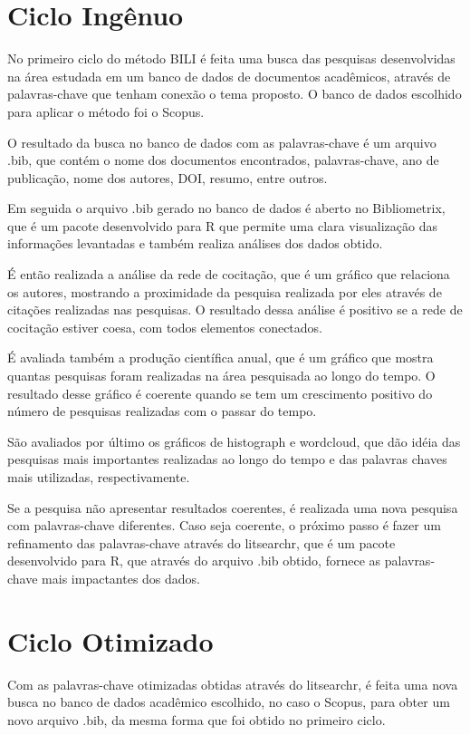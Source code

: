 \section{Ciclo Ingênuo}
No primeiro ciclo do método BILI é feita uma busca das pesquisas desenvolvidas na área estudada em um banco de dados de documentos acadêmicos, através de palavras-chave que tenham conexão o tema proposto. O banco de dados escolhido para aplicar o método foi o Scopus.

O resultado da busca no banco de dados com as palavras-chave é um arquivo .bib, que contém o nome dos documentos encontrados, palavras-chave, ano de publicação, nome dos autores, DOI, resumo, entre outros.

Em seguida o arquivo .bib gerado no banco de dados é aberto no Bibliometrix, que é um pacote desenvolvido para R que permite uma clara visualização das informações levantadas e também realiza análises dos dados obtido. 

É então realizada a análise da rede de cocitação, que é um gráfico que relaciona os autores, mostrando a proximidade da pesquisa realizada por eles através de citações realizadas nas pesquisas. O resultado dessa análise é positivo se a rede de cocitação estiver coesa, com todos elementos conectados.

É avaliada também a produção científica anual, que é um gráfico que mostra quantas pesquisas foram realizadas na área pesquisada ao longo do tempo. O resultado desse gráfico é coerente quando se tem um crescimento positivo do número de pesquisas realizadas com o passar do tempo.

São avaliados por último os gráficos de histograph e wordcloud, que dão idéia das pesquisas mais importantes realizadas ao longo do tempo e das palavras chaves mais utilizadas, respectivamente.

Se a pesquisa não apresentar resultados coerentes, é realizada uma nova pesquisa com palavras-chave diferentes. Caso seja coerente, o próximo passo é fazer um refinamento das palavras-chave através do litsearchr, que é um pacote desenvolvido para R, que através do arquivo .bib obtido, fornece as palavras-chave mais impactantes dos dados.

\section{Ciclo Otimizado}
Com as palavras-chave otimizadas obtidas através do litsearchr, é feita uma nova busca no banco de dados acadêmico escolhido, no caso o Scopus, para obter um novo arquivo .bib, da mesma forma que foi obtido no primeiro ciclo.


